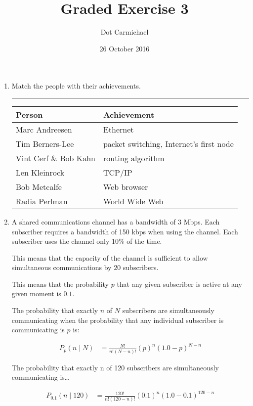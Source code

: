 \documentclass[twoside]{article}
\title{Graded Exercise 3}
\author{Dot Carmichael}
\date{26 October 2016}
\newenvironment{answer}
  {\vspace*{0.2cm} \rule{12cm}{0.04cm} \vspace*{0.2cm}}
  {\vspace*{0.2cm}}
\begin{document}
\maketitle

\begin{enumerate}
  \item Match the people with their achievements.

  \begin{answer}

  \begin{tabular}{l|l}
    \textbf{Person} & \textbf{Achievement} \\ \hline
    Marc Andreesen & Ethernet \\
    Tim Berners-Lee & packet switching, Internet's first node \\
    Vint Cerf \& Bob Kahn & routing algorithm \\    
    Len Kleinrock & TCP/IP \\
    Bob Metcalfe & Web browser \\
    Radia Perlman & World Wide Web
    \end{tabular}

    \end{answer}

  \item A shared communications channel has a bandwidth of 3 Mbps.
    Each subscriber requires a bandwidth of 150 kbps when
    using the channel.
    Each subscriber uses the channel only 10\% of the time.

    This means that the capacity of the channel is sufficient to
    allow simultaneous communications by $20$ subscribers.

    This means that the probability $p$ that any given subscriber is active at any given moment
    is $0.1$.

    The probability that exactly $n$ of $N$ subscribers are simultaneously communicating
    when the probability that any individual subscriber is communicating is $p$ is:

    \begin{align*}
      P_{p} (n \mid N ) & = \frac{N!}{n! (N - n)!} (p)^n (1.0 - p)^{N - n}
      \end{align*}

    The probability that exactly n of 120 subscribers are simultaneously communicating
    is\ldots

    \begin{align*}
      P_{0.1} (n \mid 120 ) & = \frac{120!}{n! (120 - n)!} (0.1)^n (1.0 - 0.1)^{120 - n}
      \end{align*}


\end{enumerate}
\end{document}
